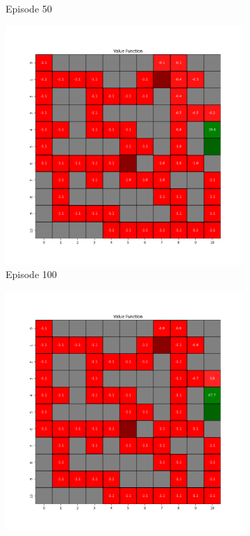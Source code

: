 \documentclass{assignment}
\begin{document}
\begin{figure}[H]
\begin{subfigure}{0.3\textwidth}
    \caption{Episode 50}
    \end{subfigure}\hfill
    \begin{subfigure}{0.3\textwidth}
        \includegraphics[width=\textwidth]{figures/value_q/gamma_sweep/value_function_alpha_0.1_gamma_0.1_epsilon_0.2_iteration_100.png}
    \caption{Episode 100}
    \end{subfigure}
    \begin{subfigure}{0.3\textwidth}
        \includegraphics[width=\textwidth]{figures/value_q/gamma_sweep/value_function_alpha_0.1_gamma_0.1_epsilon_0.2_iteration_1000.png}

\end{subfigure}
\end{figure}
\end{document}
